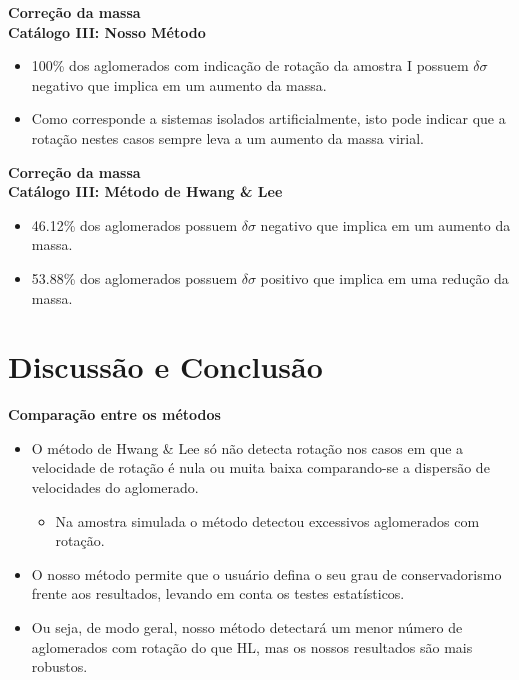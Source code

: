 \documentclass[xcolor=dvipsnames,10pt]{beamer}
\begin{document}
\begin{frame}{\textbf{Correção da massa}}
  \\
  {\textbf{Catálogo III: Nosso Método}}
  \begin{itemize}
    \item 100\% dos aglomerados com indicação de rotação da amostra I possuem $\delta \sigma$ negativo que implica em um aumento da massa.
    \item Como corresponde a sistemas isolados artificialmente, isto pode indicar que a rotação nestes casos sempre leva a um aumento da massa virial.
  \end{itemize}
\end{frame}

\begin{frame}{\textbf{Correção da massa}}
  \\
  {\textbf{Catálogo III: Método de Hwang \& Lee}}
  \begin{itemize}
    \item 46.12\% dos aglomerados possuem $\delta \sigma$ negativo que implica em um aumento da massa.
    \item 53.88\% dos aglomerados possuem $\delta \sigma$ positivo que implica em uma redução da massa.
  \end{itemize}
\end{frame}

\section{Discussão e Conclusão}
\begin{frame}{\textbf{Comparação entre os métodos}}
  \begin{itemize}
    \item O método de Hwang \& Lee só não detecta rotação nos casos em que a velocidade de rotação é nula ou muita baixa comparando-se a dispersão de velocidades do aglomerado.
    \begin{itemize}
      \item Na amostra simulada o método detectou excessivos aglomerados com rotação. 
    \end{itemize}
    \item O nosso método permite que o usuário defina o seu grau de conservadorismo frente aos resultados, levando em conta os testes estatísticos.
    \item Ou seja, de modo geral, nosso método detectará um menor número de aglomerados com rotação do que HL, mas os nossos resultados são mais robustos. 
  \end{itemize}
\end{frame}
\end{document}
